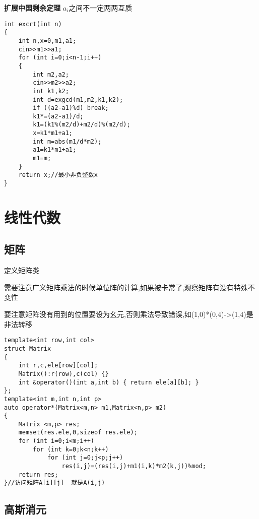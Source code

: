 \documentclass[a4paper]{ctexart}
\begin{document}
\textbf{扩展中国剩余定理} $a_i$之间不一定两两互质

\begin{lstlisting}
int excrt(int n)
{
    int n,x=0,m1,a1;
    cin>>m1>>a1;
    for (int i=0;i<n-1;i++)
    {
        int m2,a2;
        cin>>m2>>a2;
        int k1,k2;
        int d=exgcd(m1,m2,k1,k2);
        if ((a2-a1)%d) break;
        k1*=(a2-a1)/d;
        k1=(k1%(m2/d)+m2/d)%(m2/d);
        x=k1*m1+a1;
        int m=abs(m1/d*m2);
        a1=k1*m1+a1;
        m1=m;
    }
    return x;//最小非负整数x
}
\end{lstlisting}

\section{线性代数}

\subsection{矩阵}

定义矩阵类

需要注意广义矩阵乘法的时候单位阵的计算,如果被卡常了,观察矩阵有没有特殊不变性

要注意矩阵没有用到的位置要设为幺元,否则乘法导致错误,如(1,0)*(0,4)->(1,4)是非法转移

\begin{lstlisting}
template<int row,int col>
struct Matrix
{
    int r,c,ele[row][col];
    Matrix():r(row),c(col) {}
    int &operator()(int a,int b) { return ele[a][b]; }
};
template<int m,int n,int p>
auto operator*(Matrix<m,n> m1,Matrix<n,p> m2)
{
    Matrix <m,p> res;
    memset(res.ele,0,sizeof res.ele);
    for (int i=0;i<m;i++)
        for (int k=0;k<n;k++)
            for (int j=0;j<p;j++)
                res(i,j)=(res(i,j)+m1(i,k)*m2(k,j))%mod;
    return res;
}//访问矩阵A[i][j]  就是A(i,j)
\end{lstlisting}

\subsection{高斯消元}
\end{document}
